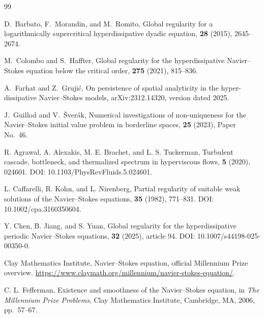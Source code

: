 \documentclass[11pt]{article}
\theoremstyle{definition}
\theoremstyle{remark}
\begin{document}
\begin{thebibliography}{99}

D.~Barbato, F.~Morandin, and M.~Romito,
\newblock Global regularity for a logarithmically supercritical hyperdissipative dyadic equation,
 \textbf{28} (2015), 2645--2674.

M.~Colombo and S.~Haffter,
\newblock Global regularity for the hyperdissipative Navier--Stokes equation below the critical order,
 \textbf{275} (2021), 815--836.

A.~Farhat and Z.~Gruji\'c,
\newblock On persistence of spatial analyticity in the hyper-dissipative Navier--Stokes models,
\newblock arXiv:2312.14320, version dated 2025.

J.~Guillod and V.~\v Sver\'ak,
\newblock Numerical investigations of non-uniqueness for the Navier--Stokes initial value problem in borderline spaces,
 \textbf{25} (2023), Paper No.~46.


R. Agrawal, A. Alexakis, M. E. Brachet, and L. S. Tuckerman,
\newblock Turbulent cascade, bottleneck, and thermalized spectrum in hyperviscous flows,
 \textbf{5} (2020), 024601.
\newblock DOI: 10.1103/PhysRevFluids.5.024601.

L. Caffarelli, R. Kohn, and L. Nirenberg,
\newblock Partial regularity of suitable weak solutions of the Navier--Stokes equations,
 \textbf{35} (1982), 771--831.
\newblock DOI: 10.1002/cpa.3160350604.

Y. Chen, B. Jiang, and S. Yuan,
\newblock Global regularity for the hyperdissipative periodic Navier--Stokes equations,
 \textbf{32} (2025), article 94.
\newblock DOI: 10.1007/s44198-025-00350-0.

Clay Mathematics Institute,
\newblock Navier--Stokes equation, official Millennium Prize overview.
\newblock \url{https://www.claymath.org/millennium/navier-stokes-equation/}.

C. L. Fefferman,
\newblock Existence and smoothness of the Navier--Stokes equation,
\newblock in {\em The Millennium Prize Problems}, Clay Mathematics Institute, Cambridge, MA, 2006, pp.~57--67.


\end{thebibliography}
\end{document}
